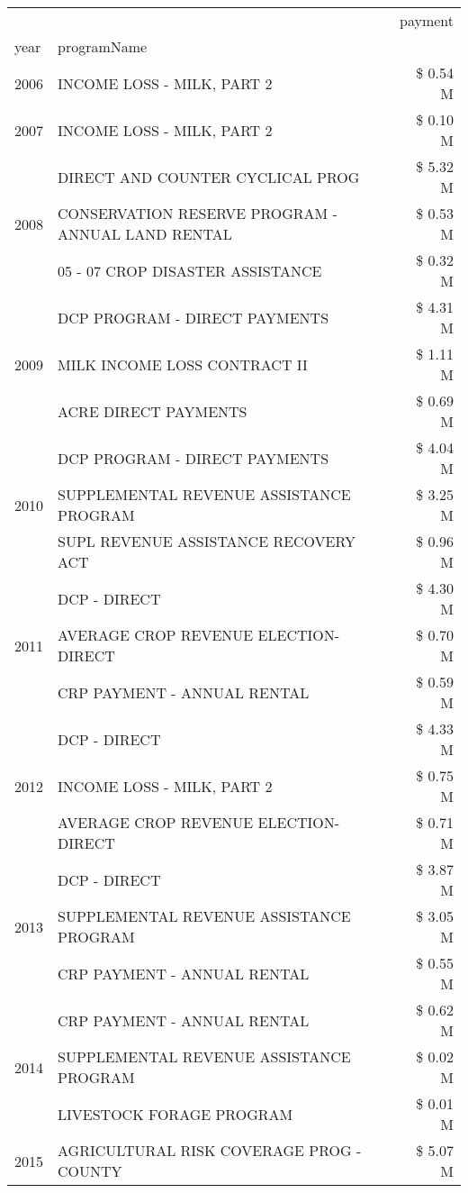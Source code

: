 \begin{tabular}{llr}
\toprule
 &  & payment \\
year & programName &  \\
\midrule
2006 & INCOME LOSS - MILK, PART 2 & \$ 0.54 M \\
\cline{1-3}
2007 & INCOME LOSS - MILK, PART 2 & \$ 0.10 M \\
\cline{1-3}
\multirow[t]{3}{*}{2008} & DIRECT AND COUNTER CYCLICAL PROG & \$ 5.32 M \\
 & CONSERVATION RESERVE PROGRAM - ANNUAL LAND RENTAL & \$ 0.53 M \\
 & 05 - 07 CROP DISASTER ASSISTANCE & \$ 0.32 M \\
\cline{1-3}
\multirow[t]{3}{*}{2009} & DCP PROGRAM - DIRECT PAYMENTS & \$ 4.31 M \\
 & MILK INCOME LOSS CONTRACT II & \$ 1.11 M \\
 & ACRE DIRECT PAYMENTS & \$ 0.69 M \\
\cline{1-3}
\multirow[t]{3}{*}{2010} & DCP PROGRAM - DIRECT PAYMENTS & \$ 4.04 M \\
 & SUPPLEMENTAL REVENUE ASSISTANCE PROGRAM & \$ 3.25 M \\
 & SUPL REVENUE ASSISTANCE RECOVERY ACT & \$ 0.96 M \\
\cline{1-3}
\multirow[t]{3}{*}{2011} & DCP - DIRECT & \$ 4.30 M \\
 & AVERAGE CROP REVENUE ELECTION-DIRECT & \$ 0.70 M \\
 & CRP PAYMENT - ANNUAL RENTAL & \$ 0.59 M \\
\cline{1-3}
\multirow[t]{3}{*}{2012} & DCP - DIRECT & \$ 4.33 M \\
 & INCOME LOSS - MILK, PART 2 & \$ 0.75 M \\
 & AVERAGE CROP REVENUE ELECTION-DIRECT & \$ 0.71 M \\
\cline{1-3}
\multirow[t]{3}{*}{2013} & DCP - DIRECT & \$ 3.87 M \\
 & SUPPLEMENTAL REVENUE ASSISTANCE PROGRAM & \$ 3.05 M \\
 & CRP PAYMENT - ANNUAL RENTAL & \$ 0.55 M \\
\cline{1-3}
\multirow[t]{3}{*}{2014} & CRP PAYMENT - ANNUAL RENTAL & \$ 0.62 M \\
 & SUPPLEMENTAL REVENUE ASSISTANCE PROGRAM & \$ 0.02 M \\
 & LIVESTOCK FORAGE PROGRAM & \$ 0.01 M \\
\cline{1-3}
\multirow[t]{3}{*}{2015} & AGRICULTURAL RISK COVERAGE PROG - COUNTY & \$ 5.07 M \\

\end{tabular}
